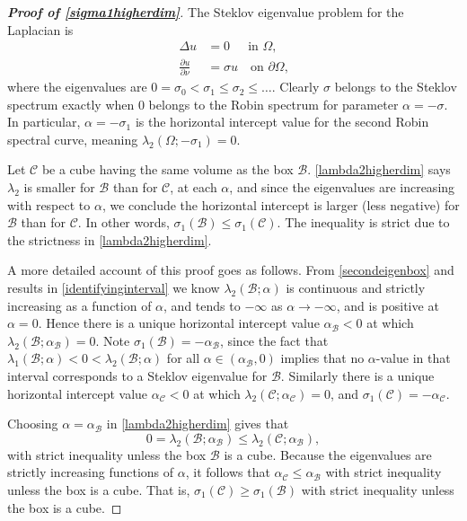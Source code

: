 \documentclass[12pt,reqno]{amsart}
\theoremstyle{definition}
\begin{document}
\begin{proof}[\bf Proof of \autoref{sigma1higherdim}]
The Steklov eigenvalue problem for the Laplacian is
\[
\begin{split}
\Delta u & = 0 \ \ \quad \text{in $\Omega$,} \\
\frac{\partial u}{\partial\nu} & = \sigma u \quad \text{on $\partial \Omega$,} 
\end{split}
\]
where the eigenvalues are $0=\sigma_0 < \sigma_1 \leq \sigma_2 \leq \dots$. Clearly $\sigma$ belongs to the Steklov spectrum exactly when $0$ belongs to the Robin spectrum for parameter $\alpha=-\sigma$. In particular, $\alpha=-\sigma_1$ is the horizontal intercept value for the second Robin spectral curve, meaning $\lambda_2(\Omega;-\sigma_1)=0$. 

Let $\mathcal{C}$ be a cube having the same volume as the box $\mathcal{B}$. \autoref{lambda2higherdim} says $\lambda_2$ is smaller for $\mathcal{B}$ than for $\mathcal{C}$, at each $\alpha$, and since the eigenvalues are increasing with respect to $\alpha$, we conclude the horizontal intercept is larger (less negative) for $\mathcal{B}$ than for $\mathcal{C}$. In other words, $\sigma_1(\mathcal{B}) \leq \sigma_1(\mathcal{C})$. The inequality is strict due to the strictness in \autoref{lambda2higherdim}. 

A more detailed account of this proof goes as follows. From \autoref{secondeigenbox} and results in \autoref{identifyinginterval} we know $\lambda_2(\mathcal{B};\alpha)$ is continuous and strictly increasing as a function of $\alpha$, and tends to $-\infty$ as $\alpha \to -\infty$, and is positive at $\alpha=0$. Hence there is a unique horizontal intercept value $\alpha_{\mathcal{B}}<0$ at which $\lambda_2(\mathcal{B};\alpha_{\mathcal{B}})=0$. Note $\sigma_1(\mathcal{B})=-\alpha_{\mathcal{B}}$, since the fact that $\lambda_1(\mathcal{B};\alpha) < 0 <\lambda_2(\mathcal{B};\alpha)$ for all $\alpha \in (\alpha_{\mathcal{B}},0)$ implies that no $\alpha$-value in that interval corresponds to a Steklov eigenvalue for $\mathcal{B}$. Similarly there is a unique horizontal intercept value $\alpha_{\mathcal{C}}<0$ at which $\lambda_2(\mathcal{C};\alpha_{\mathcal{C}})=0$, and $\sigma_1(\mathcal{C})=-\alpha_{\mathcal{C}}$. 

Choosing $\alpha=\alpha_{\mathcal{B}}$ in \autoref{lambda2higherdim} gives that
\[
0 = \lambda_2(\mathcal{B};\alpha_{\mathcal{B}}) \leq \lambda_2(\mathcal{C};\alpha_{\mathcal{B}}) ,
\]
with strict inequality unless the box $\mathcal{B}$ is a cube. Because the eigenvalues are strictly increasing functions of $\alpha$, it follows that $\alpha_{\mathcal{C}} \leq \alpha_{\mathcal{B}}$ with strict inequality unless the box is a cube. That is, $\sigma_1(\mathcal{C}) \geq \sigma_1(\mathcal{B})$ with strict inequality unless the box is a cube. 
\end{proof}
\end{document}
